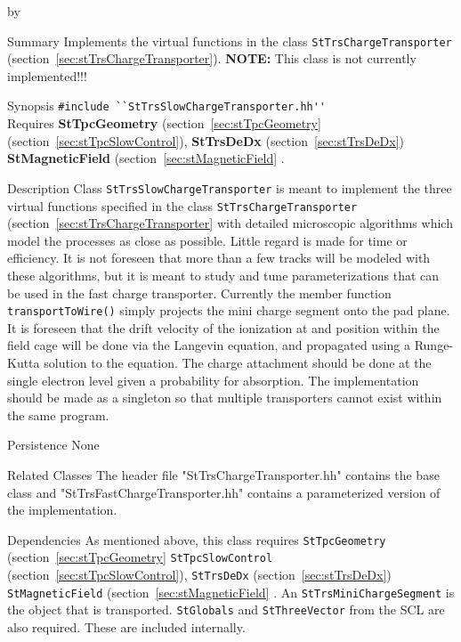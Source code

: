 \documentclass[twoside]{article}
\newcommand{\comp}[1]{\texttt{#1}}%
\newcommand{\entrylabel}[1]{\mbox{\textbf{{#1}}}\hfil}%
\newenvironment{entry}
{\begin{list}{}%
    {\renewcommand{\makelabel}{\entrylabel}%
     \setlength{\labelwidth}{90pt}%
     \setlength{\leftmargin}{\labelwidth}
     \advance\leftmargin by \labelsep%
      }%
    }%
  {\end{list}}
\newcommand{\Entrylabel}[1]%
{\raisebox{0pt}[1ex][0pt]{\makebox[\labelwidth][l]%
    {\parbox[t]{\labelwidth}{\hspace{0pt}\textbf{{#1}}}}}}
\newenvironment{Entry}%
{\renewcommand{\entrylabel}{\Entrylabel}\begin{entry}}%
  {\end{entry}}
\begin{document}
\begin{Entry}
\item[Summary]
   Implements the virtual functions in the class 
  \comp{StTrsChargeTransporter} (section~\ref{sec:stTrsChargeTransporter}).
  {\bf NOTE:} This class is not currently implemented!!!

\item[Synopsis]
 \verb+#include ``StTrsSlowChargeTransporter.hh''+\\
  Requires {\bf StTpcGeometry} (section~\ref{sec:stTpcGeometry} 
  (section~\ref{sec:stTpcSlowControl}), 
  {\bf StTrsDeDx} (section~\ref{sec:stTrsDeDx}) 
   {\bf StMagneticField} (section~\ref{sec:stMagneticField} 
  .

\item[Description]
Class \comp{StTrsSlowChargeTransporter} is meant to implement the three virtual
functions specified in the class \comp{StTrsChargeTransporter}
(section~\ref{sec:stTrsChargeTransporter} with detailed microscopic
algorithms which model the processes as close as possible.  Little regard
is made for time or efficiency.  It is not foreseen that more than a 
few tracks will be modeled with these algorithms, but it is meant to
study and tune parameterizations that can be used in the fast charge
transporter.  Currently the member function \texttt{transportToWire()}
simply projects the mini charge segment onto the pad plane.  
It is foreseen that the drift velocity of the ionization at
and position within the field cage will be done via the Langevin
equation, and propagated using a Runge-Kutta solution to the
equation.  The charge attachment
should be done at the single electron level given a probability for
absorption.  The implementation should be made as a 
singleton  so that
multiple transporters cannot exist within the same program. 

\item[Persistence]
   None

\item[Related Classes]
The header file "StTrsChargeTransporter.hh" contains the
base class and "StTrsFastChargeTransporter.hh" contains a parameterized
version of the implementation.

\item[Dependencies]
  As mentioned above, this class requires \comp{StTpcGeometry} 
  (section~\ref{sec:stTpcGeometry} 
   \comp{StTpcSlowControl} 
  (section~\ref{sec:stTpcSlowControl}), 
  \comp{StTrsDeDx} (section~\ref{sec:stTrsDeDx}) 
   \comp{StMagneticField} (section~\ref{sec:stMagneticField} 
  .  An \comp{StTrsMiniChargeSegment} is the
  object that is transported.
  \comp{StGlobals} and \comp{StThreeVector} 
  from the SCL are also required.   These are included internally.


\end{Entry}
\end{document}
